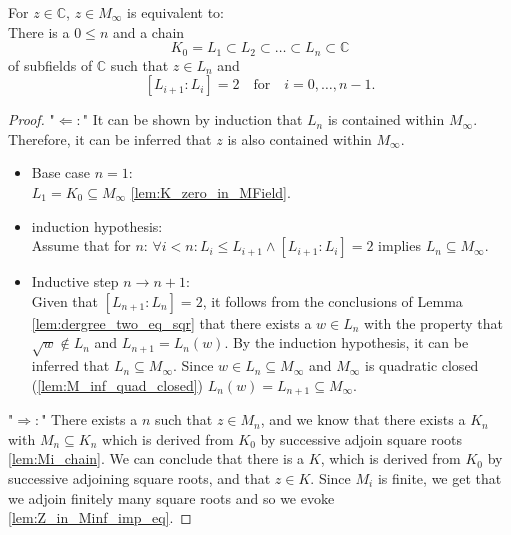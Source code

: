 \begin{theorem}
    \label{thm:Classfication_z_in_M_inf}
    \leanok
    For $z \in \mathbb{C}$, $z \in M_{\infty}$ is equivalent to:\\
    There is a $0\le n$ and a chain 
    $$K_0 = L_1 \subset L_2 \subset \ldots \subset L_n \subset \mathbb{C}$$
    of subfields of $\mathbb{C}$ such that $z \in L_n$ and 
    $$ [L_{i+1}:L_i] = 2 \quad \text{for} \quad i = 0, \ldots, n-1.$$
\end{theorem}

\begin{proof}
    \leanok
    "$\Leftarrow:$"
    It can be shown by induction that $L_n$ is contained within $M_{\infty}$. 
    Therefore, it can be inferred that $z$ is also contained within $M_{\infty}$.
    \begin{itemize}
        \item Base case $n=1$: \\
            $L_1 = K_0 \subseteq M_{\infty}$ \ref{lem:K_zero_in_MField}.
        
        \item induction hypothesis: \\
            Assume that for $n$: $\forall i < n: L_i \le L_{i+1} \land [L_{i+1}:L_i]=2$ implies $L_n \subseteq M_{\infty}$.
        \item Inductive step $n \to n+1$: \\
            Given that $[L_{n+1}:L_n] = 2$, it follows from the conclusions of Lemma \ref{lem:dergree_two_eq_sqr} that there exists a $w \in L_n$ with the property that $ \sqrt{w} \notin L_n$ and $L_{n+1} = L_n(w)$.
            By the induction hypothesis, it can be inferred that $L_n \subseteq M_{\infty}$. Since $w \in L_n  \subseteq M_{\infty}$ and $ M_{\infty}$ is quadratic closed (\ref{lem:M_inf_quad_closed}) $L_n(w) = L_{n+1} \subseteq M_{\infty}$.
    \end{itemize}
    "$\Rightarrow:$" There exists a $n$ such that $z\in M_n$, and we know that there exists a $K_n$ with $M_n \subseteq K_n$ which is derived from $K_0$ by successive adjoin square roots \ref{lem:Mi_chain}. 
    We can conclude that there is a $K$, which is derived from $K_0$ by successive adjoining square roots, and that $z\in K$. 
    Since $M_i$ is finite, we get that we adjoin finitely many square roots and so we evoke \ref{lem:Z_in_Minf_imp_eq}. 

\end{proof}

